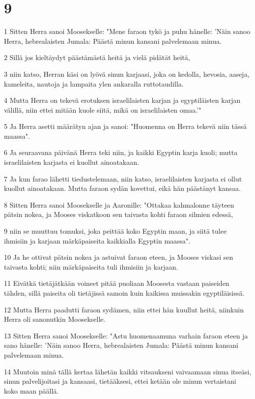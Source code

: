 \chapter{9}

\par 1 Sitten Herra sanoi Moosekselle: "Mene faraon tykö ja puhu hänelle: 'Näin sanoo Herra, hebrealaisten Jumala: Päästä minun kansani palvelemaan minua.
\par 2 Sillä jos kieltäydyt päästämästä heitä ja vielä pidätät heitä,
\par 3 niin katso, Herran käsi on lyövä sinun karjaasi, joka on kedolla, hevosia, aaseja, kameleita, nautoja ja lampaita ylen ankaralla ruttotaudilla.
\par 4 Mutta Herra on tekevä erotuksen israelilaisten karjan ja egyptiläisten karjan välillä, niin ettei mitään kuole siitä, mikä on israelilaisten omaa.'"
\par 5 Ja Herra asetti määrätyn ajan ja sanoi: "Huomenna on Herra tekevä niin tässä maassa".
\par 6 Ja seuraavana päivänä Herra teki niin, ja kaikki Egyptin karja kuoli; mutta israelilaisten karjasta ei kuollut ainoatakaan.
\par 7 Ja kun farao lähetti tiedustelemaan, niin katso, israelilaisten karjasta ei ollut kuollut ainoatakaan. Mutta faraon sydän kovettui, eikä hän päästänyt kansaa.
\par 8 Sitten Herra sanoi Moosekselle ja Aaronille: "Ottakaa kahmalonne täyteen pätsin nokea, ja Mooses viskatkoon sen taivasta kohti faraon silmien edessä,
\par 9 niin se muuttuu tomuksi, joka peittää koko Egyptin maan, ja siitä tulee ihmisiin ja karjaan märkäpaiseita kaikkialla Egyptin maassa".
\par 10 Ja he ottivat pätsin nokea ja astuivat faraon eteen, ja Mooses viskasi sen taivasta kohti; niin märkäpaiseita tuli ihmisiin ja karjaan.
\par 11 Eivätkä tietäjätkään voineet pitää puoliaan Moosesta vastaan paiseiden tähden, sillä paiseita oli tietäjissä samoin kuin kaikissa muissakin egyptiläisissä.
\par 12 Mutta Herra paadutti faraon sydämen, niin ettei hän kuullut heitä, niinkuin Herra oli sanonutkin Moosekselle.
\par 13 Sitten Herra sanoi Moosekselle: "Astu huomenaamuna varhain faraon eteen ja sano hänelle: 'Näin sanoo Herra, hebrealaisten Jumala: Päästä minun kansani palvelemaan minua.
\par 14 Muutoin minä tällä kertaa lähetän kaikki vitsaukseni vaivaamaan sinua itseäsi, sinun palvelijoitasi ja kansaasi, tietääksesi, ettei ketään ole minun vertaistani koko maan päällä.

